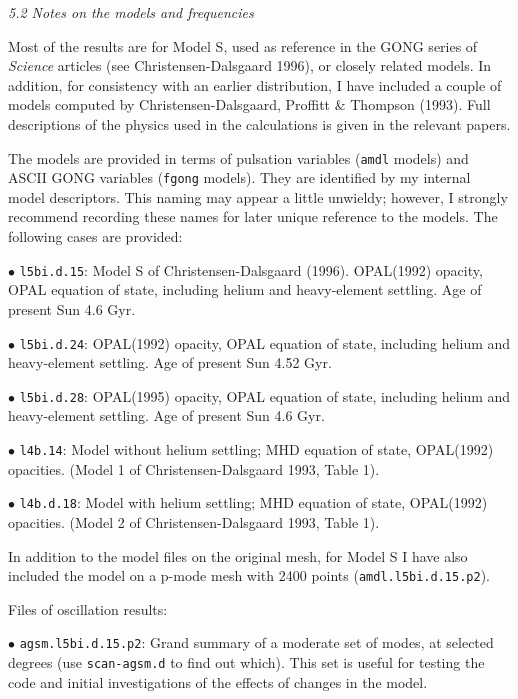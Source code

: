\subsect
{\it 5.2 Notes on the models and frequencies}

Most of the results are for Model S, used as reference in the GONG
series of {\it Science} articles (see Christensen-Dalsgaard {\etal} 1996),
or closely related models.
In addition, for consistency with an earlier
distribution, I have included a couple of models
computed by Christensen-Dalsgaard, Proffitt \& Thompson (1993).
Full descriptions of the physics used in the calculations
is given in the relevant papers.

The models are 
provided in terms of pulsation variables ({\tt amdl} models)
and ASCII GONG variables ({\tt fgong} models).
They are identified by my internal model descriptors.
This naming may appear a little unwieldy; however, I strongly
recommend recording these names for later unique reference to the models.
The following cases are provided:
\medskip
\item{$\bullet$} 
{\tt l5bi.d.15}: Model S of Christensen-Dalsgaard {\etal} (1996). 
OPAL(1992) opacity, OPAL equation of state,
including helium and heavy-element settling. Age of present Sun 4.6 Gyr.
\item{$\bullet$} 
{\tt l5bi.d.24}: OPAL(1992) opacity, OPAL equation of state,
including helium and heavy-element settling. Age of present Sun 4.52 Gyr.
\item{$\bullet$} 
{\tt l5bi.d.28}: OPAL(1995) opacity, OPAL equation of state,
including helium and heavy-element settling. Age of present Sun 4.6 Gyr.
\medskip
\item{$\bullet$} 
{\tt l4b.14}: Model without helium settling;
MHD equation of state, OPAL(1992) opacities.\nwl
(Model 1 of Christensen-Dalsgaard {\etal} 1993, Table 1).
\item{$\bullet$} 
{\tt l4b.d.18}: Model with helium settling;
MHD equation of state, OPAL(1992) opacities.\nwl
(Model 2 of Christensen-Dalsgaard {\etal} 1993, Table 1).

\medskip
In addition to the model files on the original mesh,
for Model S I have also included the model on a p-mode mesh
with 2400 points ({\tt amdl.l5bi.d.15.p2}).

\bigskip\noindent
Files of oscillation results:
\medskip

\item{$\bullet$} 
{\tt agsm.l5bi.d.15.p2}: Grand summary of
a moderate set of modes, at selected degrees
(use {\tt scan-agsm.d} to find out which).
This set is useful for testing the code and initial investigations
of the effects of changes in the model.

